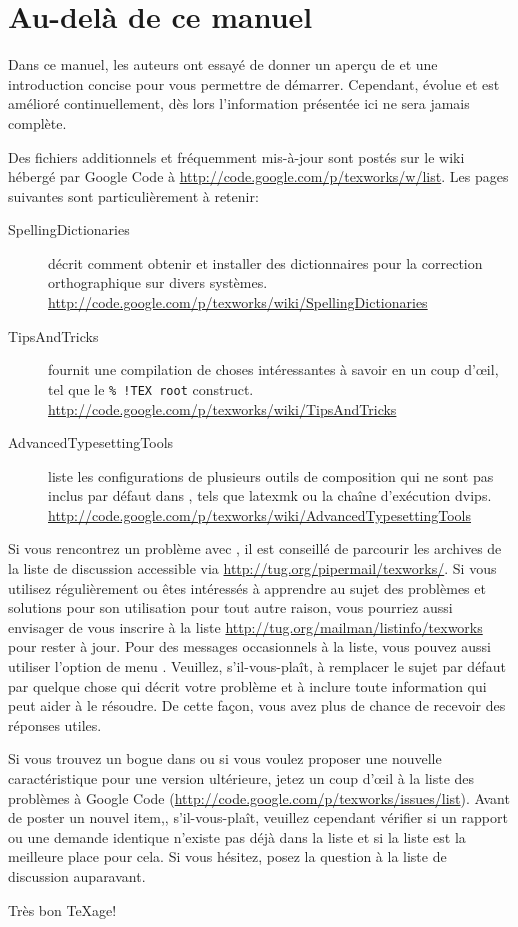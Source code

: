 
\chapter{Au-del{\`a} de ce manuel}

Dans ce manuel, les auteurs ont essayé de donner un aperçu de \Tw{} et une introduction concise pour vous permettre de démarrer. Cependant, \Tw{} évolue et est amélioré continuellement, dès lors l'information présentée ici ne sera jamais complète.

Des fichiers additionnels et fréquemment mis-à-jour sont postés sur le wiki hébergé par Google Code à \url{http://code.google.com/p/texworks/w/list}. Les pages suivantes sont particulièrement à retenir:
\begin{description}
\item[SpellingDictionaries] décrit comment obtenir et installer des dictionnaires pour la correction orthographique sur divers systèmes. \url{http://code.google.com/p/texworks/wiki/SpellingDictionaries}
\item[TipsAndTricks] fournit une compilation de choses intéressantes à savoir en un coup d'œil, tel que le \verb|% !TEX root| construct. \url{http://code.google.com/p/texworks/wiki/TipsAndTricks}
\item[AdvancedTypesettingTools] liste les configurations de plusieurs outils de composition qui ne sont pas inclus par défaut dans \Tw, tels que latexmk ou la chaîne d'exécution dvips. \url{http://code.google.com/p/texworks/wiki/AdvancedTypesettingTools}
\end{description}

Si vous rencontrez un problème avec \Tw, il est conseillé de parcourir les archives de la liste de discussion accessible via \url{http://tug.org/pipermail/texworks/}. Si vous utilisez \Tw{} régulièrement ou êtes intéressés à apprendre au sujet des problèmes et solutions pour son utilisation pour tout autre raison, vous pourriez aussi envisager de vous inscrire à la liste \url{http://tug.org/mailman/listinfo/texworks} pour rester à jour. Pour des messages occasionnels à la liste, vous pouvez aussi utiliser l'option de menu \submenu{}. Veuillez, s'il-vous-plaît, à remplacer le sujet par défaut par quelque chose qui décrit votre problème et à inclure toute information qui peut aider à le résoudre. De cette façon, vous avez plus de chance de recevoir des réponses utiles.

Si vous trouvez un bogue dans \Tw{} ou si vous voulez proposer une nouvelle caractéristique pour une version ultérieure, jetez un coup d'œil à la liste des problèmes à Google Code (\url{http://code.google.com/p/texworks/issues/list}). Avant de poster un nouvel item,, s'il-vous-plaît, veuillez cependant vérifier si un rapport ou une demande identique n'existe pas déjà dans la liste et si la liste est la meilleure place pour cela. Si vous hésitez, posez la question à la liste de discussion auparavant.

Très bon \TeX{}age!
